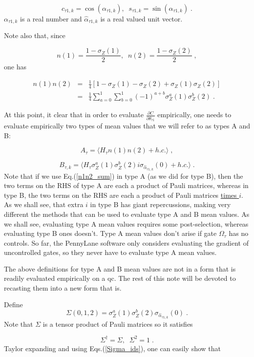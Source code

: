 \documentclass[12pt]{article}
\newcommand{\beq}{\begin{equation}}
\newcommand{\eeq}{\end{equation}}
\newcommand{\beqa}{\begin{eqnarray}}
\newcommand{\eeqa}{\end{eqnarray}}
\begin{document}
{\beq
c_{\tau 1,k} = \cos(\alpha_{\tau 1,k}), \;\;
s_{\tau 1,k} = \sin(\alpha_{\tau 1,k})
\;.
\eeq
$\alpha_{\tau 1,k}$ is a real number
and $\hat{\alpha}_{\tau 1,k}$ is a real
valued unit vector.

Note also that, since

\beq
n(1)  = \frac{1-\sigma_Z(1)}{2}, \;\;
n(2)  = \frac{1-\sigma_Z(2)}{2}
\;,
\eeq
one has

\beqa
n(1)n(2) &=&
\frac{1}{4}[1 - \sigma_Z(1) - \sigma_Z(2)
+ \sigma_Z(1)\sigma_Z(2)]\\&=&
\frac{1}{4}\sum_{a=0}^1\sum_{b=0}^1 (-1)^{a+b}
 \sigma^a_Z(1)\sigma^b_Z(2)
\;.
\label{n1n2_sum}
\eeqa

At this point, it clear that
in order to evaluate
$\frac{\partial C}{\partial\theta_{\tau 1}}$
empirically, one needs to
evaluate empirically two
types of mean values
that we will refer to as types A and B:

\beq
A_\tau = \langle H_\tau n(1)n(2) + h.c.\rangle
\;,
\label{first_A_def}
\eeq

\beq
B_{\tau,k} = \langle H_\tau \sigma^a_Z(1)\sigma_Z^b(2)
i \sigma_{\hat{\alpha}_{\tau 1,k}}(0) + h.c.\rangle
\;.
\eeq
Note that if we use Eq.(\ref{n1n2_sum})
in type A (as we did for type B),
then the two terms on the RHS of type A
are each a product of Pauli matrices,
whereas in type B, the two terms on the RHS
are each a product of Pauli matrices \underline{times $i$}.
As we shall see, that extra $i$ in type B
has giant repercussions, making very different
the methods that can be used to evaluate  type A and B
mean values. As we shall see, evaluating
type A mean values
requires some post-selection, whereas
evaluating type B ones doesn't.
Type A mean values don't arise if
gate $\Omega_\tau$ has no controls.
So far, the PennyLane software only
considers evaluating the gradient of uncontrolled
gates, so they never have to evaluate
type A mean values.

The above definitions for type A and B
mean values are not in a form that is
readily evaluated empirically on a qc.
The rest of this note will be devoted to
recasting them into a new form that is.


Define
\beq
\Sigma(0,1,2) = \sigma^a_Z(1)\sigma_Z^b(2)
 \sigma_{\hat{\alpha}_{\tau 1,k}}(0)
\;.
\eeq
Note that $\Sigma$
is a tensor product of Pauli matrices so it satisfies

\beq
\Sigma^\dagger = \Sigma, \;\; \Sigma^2=1
\;.
\label{Sigma_ids}
\eeq
Taylor expanding and using Eqs.(\ref{Sigma_ids}),
one can easily show that

}
\end{document}
